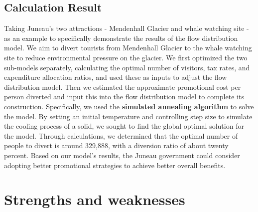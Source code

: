 \documentclass[12pt]{article}  %
\begin{document}
\subsection{Calculation Result}
Taking Juneau's two attractions - Mendenhall Glacier and whale watching site - as an example to specifically demonstrate the results of the flow distribution model.
We aim to divert tourists from Mendenhall Glacier to the whale watching site to reduce environmental pressure on the glacier. We first optimized the two sub-models separately, calculating the optimal number of visitors, tax rates, and expenditure allocation ratios, and used these as inputs to adjust the flow distribution model. Then we estimated the approximate promotional cost per person diverted and input this into the flow distribution model to complete its construction.
Specifically, we used the \textbf{simulated annealing algorithm} to solve the model. By setting an initial temperature and controlling step size to simulate the cooling process of a solid, we sought to find the global optimal solution for the model.
Through calculations, we determined that the optimal number of people to divert is around 329,888, with a diversion ratio of about twenty percent. Based on our model's results, the Juneau government could consider adopting better promotional strategies to achieve better overall benefits.


\section{Strengths and weaknesses}
\end{document}
